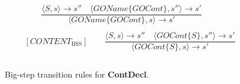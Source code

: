 \begin{figure}[htbp]
	\centering
	\begin{gather*}
		[GAMEOBJECT_\text{BSS}] 
		\qquad \dfrac
		{\langle S, s\rangle \rightarrow s'' \quad\langle GOName \{GOCont\}, s''\rangle \rightarrow s'}
		{\langle GOName \{GOCont\}, s\rangle\rightarrow s'}
		\\
		\\
		[CONTENT_\text{BSS}] 
		\qquad \dfrac
		{\langle S, s\rangle \rightarrow s'' \quad\langle GOCont \{S\}, s''\rangle \rightarrow s'}
		{\langle GOCont \{S\}, s\rangle\rightarrow s'}
		\\
		\\
	\end{gather*}
	\caption{Big-step transition rules for \textbf{ContDecl}.}
	\label{fig:BssStm}
\end{figure}
